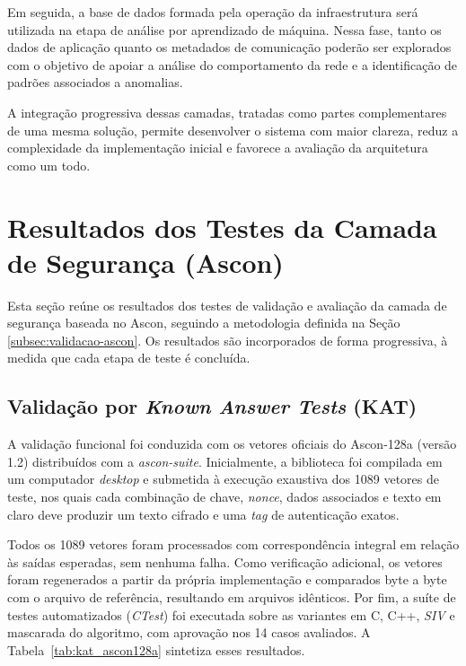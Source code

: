 Em seguida, a base de dados formada pela operação da infraestrutura será utilizada na etapa de análise por aprendizado de máquina. Nessa fase, tanto os dados de aplicação quanto os metadados de comunicação poderão ser explorados com o objetivo de apoiar a análise do comportamento da rede e a identificação de padrões associados a anomalias.

A integração progressiva dessas camadas, tratadas como partes complementares de uma mesma solução, permite desenvolver o sistema com maior clareza, reduz a complexidade da implementação inicial e favorece a avaliação da arquitetura como um todo.


\section{Resultados dos Testes da Camada de Segurança (Ascon)}

Esta seção reúne os resultados dos testes de validação e avaliação da camada de segurança baseada no Ascon, seguindo a metodologia definida na Seção \ref{subsec:validacao-ascon}. Os resultados são incorporados de forma progressiva, à medida que cada etapa de teste é concluída.


\subsection{Validação por \textit{Known Answer Tests} (KAT)}

A validação funcional foi conduzida com os vetores oficiais do Ascon-128a (versão 1.2) distribuídos com a \textit{ascon-suite}. Inicialmente, a biblioteca foi compilada em um computador \textit{desktop} e submetida à execução exaustiva dos 1089 vetores de teste, nos quais cada combinação de chave, \textit{nonce}, dados associados e texto em claro deve produzir um texto cifrado e uma \textit{tag} de autenticação exatos.

Todos os 1089 vetores foram processados com correspondência integral em relação às saídas esperadas, sem nenhuma falha. Como verificação adicional, os vetores foram regenerados a partir da própria implementação e comparados byte a byte com o arquivo de referência, resultando em arquivos idênticos. Por fim, a suíte de testes automatizados (\textit{CTest}) foi executada sobre as variantes em C, C++, \textit{SIV} e mascarada do algoritmo, com aprovação nos 14 casos avaliados. A Tabela~\ref{tab:kat_ascon128a} sintetiza esses resultados.

